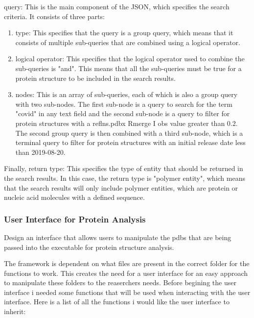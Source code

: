 \documentclass[]{final_report}
\begin{document}
query: This is the main component of the JSON, which specifies the search criteria. It consists of three parts:

\begin{enumerate}
    \item type: This specifies that the query is a group query, which means that it consists of multiple sub-queries that are combined using a logical operator.
    \item logical operator: This specifies that the logical operator used to combine the sub-queries is "and". This means that all the sub-queries must be true for a protein structure to be included in the search results.
    \item nodes: This is an array of sub-queries, each of which is also a group query with two sub-nodes. The first sub-node is a query to search for the term "covid" in any text field and the second sub-node is a query to filter for protein structures with a reflns.pdbx Rmerge I obs value greater than 0.2. The second group query is then combined with a third sub-node, which is a terminal query to filter for protein structures with an initial release date less than 2019-08-20.
\end{enumerate}

Finally, return type: This specifies the type of entity that should be returned in the search results. In this case, the return type is "polymer entity", which means that the search results will only include polymer entities, which are protein or nucleic acid molecules with a defined sequence.







\clearpage

\subsubsection{User Interface for Protein Analysis}
\begin{displayquote}
    Design an interface that allows users to manipulate the pdbs that are being passed into
    the executable for protein structure analysis.
\end{displayquote}

The framework is dependent on what files are present in the correct folder for the functions to work. This creates the need for a user interface for an easy approach to manipulate these folders to the reaserchers needs. Before begining the user interface i needed some functions that will be used when interacting with the user interface. Here is a list of all the functions i would like the user interface to inherit:
\end{document}
